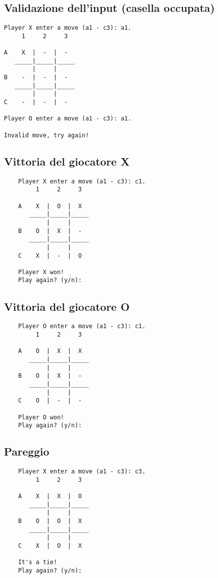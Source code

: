 \documentclass{article}
\begin{document}
\subsection{Validazione dell'input (casella occupata)}
    \begin{verbatim}
Player X enter a move (a1 - c3): a1.
     1     2     3

A    X  |  -  |  -  
   _____|_____|_____
        |     |     
B    -  |  -  |  -  
   _____|_____|_____
        |     |     
C    -  |  -  |  -  

Player O enter a move (a1 - c3): a1.

Invalid move, try again!
    \end{verbatim}

\subsection{Vittoria del giocatore X}
    \begin{verbatim}
    Player X enter a move (a1 - c3): c1.
         1     2     3

    A    X  |  O  |  X  
       _____|_____|_____
            |     |     
    B    O  |  X  |  -  
       _____|_____|_____
            |     |     
    C    X  |  -  |  O  

    Player X won!
    Play again? (y/n): 
    \end{verbatim}

\subsection{Vittoria del giocatore O}
    \begin{verbatim}
    Player O enter a move (a1 - c3): c1.
         1     2     3

    A    O  |  X  |  X  
       _____|_____|_____
            |     |     
    B    O  |  X  |  -  
       _____|_____|_____
            |     |     
    C    O  |  -  |  -  

    Player O won!
    Play again? (y/n): 
    \end{verbatim}

\subsection{Pareggio}
    \begin{verbatim}
    Player X enter a move (a1 - c3): c3.
         1     2     3

    A    X  |  X  |  O  
       _____|_____|_____
            |     |     
    B    O  |  O  |  X  
       _____|_____|_____
            |     |     
    C    X  |  O  |  X  

    It's a tie!
    Play again? (y/n): 
    \end{verbatim}
\end{document}

